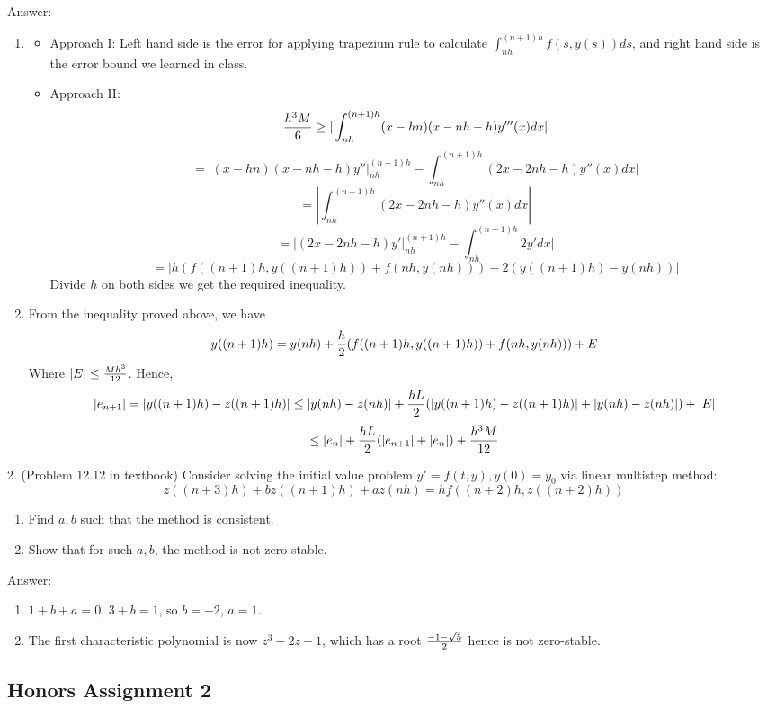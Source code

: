 \documentclass{article} %
\theoremstyle{break}
\begin{document}
Answer:

\begin{enumerate}
\item\begin{itemize}
  \item Approach I: Left hand side is the error for applying trapezium rule to calculate $\int_{nh}^{(n+1)h}f(s, y(s))ds$, and right hand side is the error bound we learned in class.
  \item Approach II:
    \[{h^3M\over 6}\geq |\int_{nh}^{(n+1)h}(x-hn)(x-nh-h)y'''(x)dx|\]
    \[=|(x-hn)(x-nh-h)y''|_{nh}^{(n+1)h}-\int_{nh}^{(n+1)h}(2x-2nh-h)y''(x)dx|\]
    \[=|\int_{nh}^{(n+1)h}(2x-2nh-h)y''(x)dx|\]
    \[=|(2x-2nh-h)y'|_{nh}^{(n+1)h}-\int_{nh}^{(n+1)h}2y'dx|\]
    \[=|h(f((n+1)h, y((n+1)h))+f(nh, y(nh)))-2(y((n+1)h)-y(nh))|\]
    Divide $h$ on both sides we get the required inequality.
    
   \end{itemize}
 \item From the inequality proved above, we have
   \[y((n+1)h)=y(nh)+{h\over 2}(f((n+1)h, y((n+1)h))+f(nh, y(nh)))+E\]
   Where $|E|\leq {Mh^3\over 12}$. Hence,
   \[|e_{n+1}|=|y((n+1)h)-z((n+1)h)|\leq |y(nh)-z(nh)|+{hL\over 2}(|y((n+1)h)-z((n+1)h)|+|y(nh)-z(nh)|)+|E|\]
   \[\leq |e_n|+{hL\over 2}(|e_{n+1}|+|e_n|)+{h^3M\over 12}\]
\end{enumerate}

2. (Problem 12.12 in textbook) Consider solving the initial value problem $y'=f(t, y), y(0)=y_0$ via linear multistep method:
\[z((n+3)h)+bz((n+1)h)+az(nh)=hf((n+2)h, z((n+2)h))\]
\begin{enumerate}
\item Find $a, b$ such that the method is consistent.
\item Show that for such $a, b$, the method is not zero stable.
\end{enumerate}

Answer:
\begin{enumerate}
\item $1+b+a=0$, $3+b=1$, so $b=-2$, $a=1$.
\item The first characteristic polynomial is now $z^3-2z+1$, which has a root ${-1-\sqrt{5}\over 2}$ hence is not zero-stable.
\end{enumerate}

\subsection{Honors Assignment 2}
\end{document}
